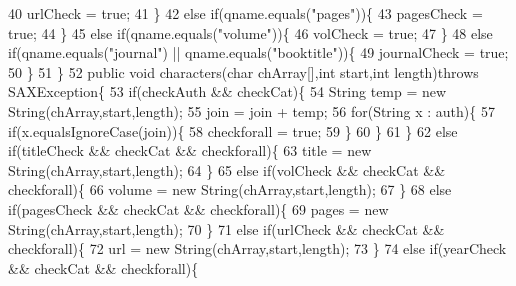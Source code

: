 \begin{DoxyCode}
40                         urlCheck = \textcolor{keyword}{true};
41                     \}
42                     \textcolor{keywordflow}{else} \textcolor{keywordflow}{if}(qname.equals(\textcolor{stringliteral}{"pages"}))\{
43                         pagesCheck = \textcolor{keyword}{true};
44                     \}
45                     \textcolor{keywordflow}{else} \textcolor{keywordflow}{if}(qname.equals(\textcolor{stringliteral}{"volume"}))\{
46                         volCheck = \textcolor{keyword}{true};
47                     \}
48                     \textcolor{keywordflow}{else} \textcolor{keywordflow}{if}(qname.equals(\textcolor{stringliteral}{"journal"}) || qname.equals(\textcolor{stringliteral}{"booktitle"}))\{
49                         journalCheck = \textcolor{keyword}{true};
50                     \}
51                 \}
52                 \textcolor{keyword}{public} \textcolor{keywordtype}{void} characters(\textcolor{keywordtype}{char} chArray[],\textcolor{keywordtype}{int} start,\textcolor{keywordtype}{int} length)\textcolor{keywordflow}{throws} SAXException\{
53                     \textcolor{keywordflow}{if}(checkAuth && checkCat)\{
54                         String temp = \textcolor{keyword}{new} String(chArray,start,length); 
55                         join = join + temp;
56                         \textcolor{keywordflow}{for}(String x : auth)\{
57                             \textcolor{keywordflow}{if}(x.equalsIgnoreCase(join))\{
58                                 checkforall = \textcolor{keyword}{true};
59                             \}
60                         \}
61                     \}
62                     \textcolor{keywordflow}{else} \textcolor{keywordflow}{if}(titleCheck && checkCat && checkforall)\{
63                         title = \textcolor{keyword}{new} String(chArray,start,length);
64                     \}
65                     \textcolor{keywordflow}{else} \textcolor{keywordflow}{if}(volCheck && checkCat && checkforall)\{
66                         volume = \textcolor{keyword}{new} String(chArray,start,length);
67                     \}
68                     \textcolor{keywordflow}{else} \textcolor{keywordflow}{if}(pagesCheck && checkCat && checkforall)\{
69                         pages = \textcolor{keyword}{new} String(chArray,start,length);
70                     \}
71                     \textcolor{keywordflow}{else} \textcolor{keywordflow}{if}(urlCheck && checkCat && checkforall)\{
72                         url = \textcolor{keyword}{new} String(chArray,start,length);
73                     \}
74                     \textcolor{keywordflow}{else} \textcolor{keywordflow}{if}(yearCheck && checkCat && checkforall)\{

\end{DoxyCode}
